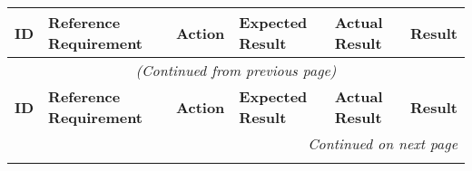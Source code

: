 \documentclass[12pt, titlepage]{article}
\begin{document}
\begin{longtable}{|c|p{2.5cm}|p{2.5cm}|p{4cm}|p{3cm}|c|}
\hline
\textbf{ID} & \textbf{Reference Requirement} & \textbf{Action} & \textbf{Expected Result} & \textbf{Actual Result} & \textbf{Result} \\ \hline
\endfirsthead

\multicolumn{6}{c}{\textit{(Continued from previous page)}} \\ \hline
\textbf{ID} & \textbf{Reference Requirement} & \textbf{Action} & \textbf{Expected Result} & \textbf{Actual Result} & \textbf{Result} \\ \hline
\endhead

\hline \multicolumn{6}{|r|}{\textit{Continued on next page}} \\ \hline
\endfoot

\hline
\endlastfoot


\end{longtable}
\end{document}

